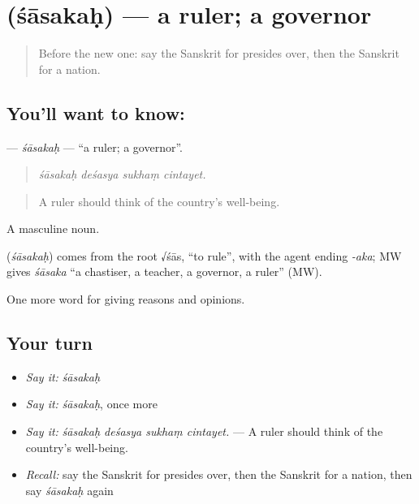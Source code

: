 \section[\texorpdfstring{\sk{शासकः} (śāsakaḥ)}{शासकः (śāsakaḥ)}]{ (śāsakaḥ) — a ruler; a governor}

\label{lesson:SA-C353-sasakah}



\begin{quote}
Before the new one: say the Sanskrit for presides over, then the Sanskrit for a nation.
\end{quote}

\subsection*{You'll want to know: }
\textbf{} — \emph{śāsakaḥ} — \textquotedblleft{}a ruler; a governor\textquotedblright{}.

\begin{quote}
   
\end{quote}

\begin{quote}
\emph{śāsakaḥ deśasya sukhaṃ cintayet.}
\end{quote}

\begin{quote}
A ruler should think of the country's well-being.
\end{quote}

A masculine noun.

\begin{cousinweb}
\textbf{} (\emph{śāsakaḥ}) comes from the root √śās, \textquotedblleft{}to rule\textquotedblright{}, with the agent ending \emph{-aka}; MW gives \emph{śāsaka} \textquotedblleft{}a chastiser, a teacher, a governor, a ruler\textquotedblright{} (MW).
\end{cousinweb}

\begin{grammarlens}[title={What you've built}]
One more word for giving reasons and opinions.
\end{grammarlens}

\subsection*{Your turn}
\begin{itemize}
\raggedright
  \item \emph{Say it:} \emph{śāsakaḥ}
  \item \emph{Say it:} \emph{śāsakaḥ}, once more
  \item \emph{Say it:} \emph{śāsakaḥ deśasya sukhaṃ cintayet.} — A ruler should think of the country's well-being.
  \item \emph{Recall:} say the Sanskrit for presides over, then the Sanskrit for a nation, then say \emph{śāsakaḥ} again
\end{itemize}

